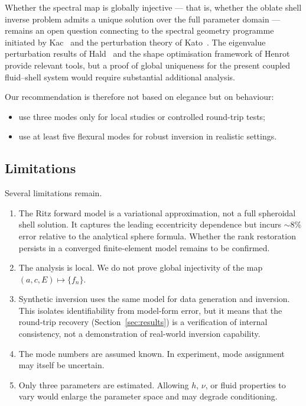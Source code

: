 Whether the spectral map is globally injective --- that is, whether the oblate
shell inverse problem admits a unique solution over the full parameter domain
--- remains an open question connecting to the spectral geometry programme
initiated by Kac~\cite{Kac1966} and the perturbation theory of
Kato~\cite{Kato1966}.  The eigenvalue perturbation results of
Hald~\cite{Hald1978,Hald1984CPAM} and the shape optimisation framework of
Henrot~\cite{Henrot2006} provide relevant tools, but a proof of global
uniqueness for the present coupled fluid--shell system would require substantial
additional analysis.

Our recommendation is therefore not based on elegance but on behaviour:
\begin{itemize}
  \item use three modes only for local studies or controlled round-trip tests;
  \item use at least five flexural modes for robust inversion in realistic
  settings.
\end{itemize}

\subsection{Limitations}

Several limitations remain.
\begin{enumerate}
  \item The Ritz forward model is a variational approximation, not a full
  spheroidal shell solution.  It captures the leading eccentricity dependence
  but incurs $\sim\!8\%$ error relative to the analytical sphere formula.  Whether the
  rank restoration persists in a converged finite-element model remains to be
  confirmed.
  \item The analysis is local.  We do not prove global injectivity of the map
  $(a,c,E)\mapsto \{f_n\}$.
  \item Synthetic inversion uses the same model for data generation and
  inversion.  This isolates identifiability from model-form error, but it
  means that the round-trip recovery (Section~\ref{sec:results}) is a
  verification of internal consistency, not a demonstration of real-world
  inversion capability.
  \item The mode numbers are assumed known.  In experiment, mode assignment may
  itself be uncertain.
  \item Only three parameters are estimated.  Allowing $h$, $\nu$, or fluid
  properties to vary would enlarge the parameter space and may degrade
  conditioning.
\end{enumerate}

